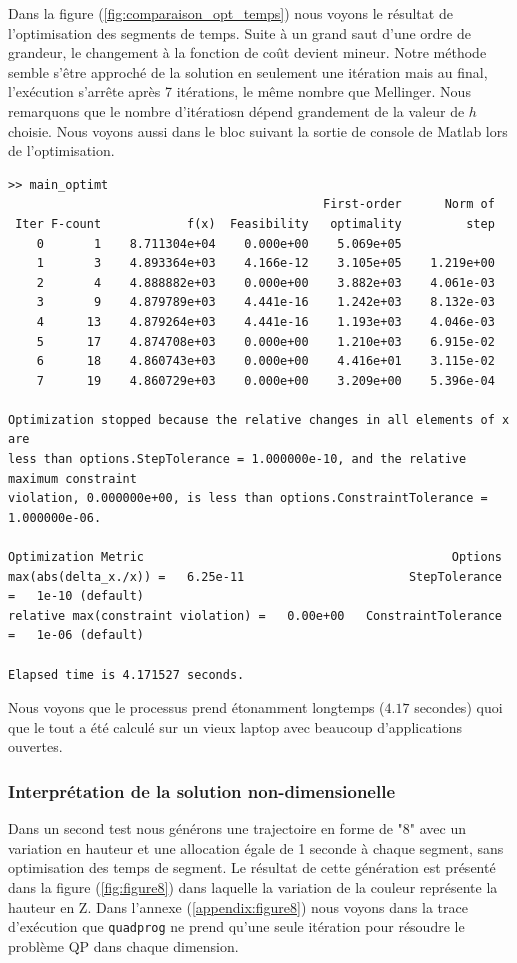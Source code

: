 Dans la figure (\ref{fig:comparaison_opt_temps}) nous voyons le résultat de l'optimisation des segments de temps. Suite à un grand saut d'une ordre de grandeur, le changement à la fonction de coût devient mineur. 
Notre méthode semble s'être approché de la solution en seulement une itération mais au final, l'exécution s'arrête après 7 itérations, le même nombre que Mellinger. Nous remarquons que le nombre d'itératiosn dépend grandement de la valeur de $h$ choisie. Nous voyons aussi dans le bloc suivant la sortie de console de Matlab lors de l'optimisation.

\begin{verbatim}
>> main_optimt
                                            First-order      Norm of
 Iter F-count            f(x)  Feasibility   optimality         step
    0       1    8.711304e+04    0.000e+00    5.069e+05
    1       3    4.893364e+03    4.166e-12    3.105e+05    1.219e+00
    2       4    4.888882e+03    0.000e+00    3.882e+03    4.061e-03
    3       9    4.879789e+03    4.441e-16    1.242e+03    8.132e-03
    4      13    4.879264e+03    4.441e-16    1.193e+03    4.046e-03
    5      17    4.874708e+03    0.000e+00    1.210e+03    6.915e-02
    6      18    4.860743e+03    0.000e+00    4.416e+01    3.115e-02
    7      19    4.860729e+03    0.000e+00    3.209e+00    5.396e-04

Optimization stopped because the relative changes in all elements of x are
less than options.StepTolerance = 1.000000e-10, and the relative maximum constraint
violation, 0.000000e+00, is less than options.ConstraintTolerance = 1.000000e-06.

Optimization Metric                                           Options
max(abs(delta_x./x)) =   6.25e-11                       StepTolerance =   1e-10 (default)
relative max(constraint violation) =   0.00e+00   ConstraintTolerance =   1e-06 (default)

Elapsed time is 4.171527 seconds.
\end{verbatim}

Nous voyons que le processus prend étonamment longtemps ($4.17$ secondes) quoi que le tout a été calculé sur un vieux laptop avec beaucoup d'applications ouvertes.

\subsubsection{Interprétation de la solution non-dimensionelle}

Dans un second test nous générons une trajectoire en forme de "8" avec un variation en hauteur et une allocation égale de 1 seconde à chaque segment, sans optimisation des temps de segment. Le résultat de cette génération est présenté dans la figure (\ref{fig:figure8}) dans laquelle la variation de la couleur représente la hauteur en Z. Dans l'annexe (\ref{appendix:figure8}) nous voyons dans la trace d'exécution que \texttt{quadprog} ne prend qu'une seule itération pour résoudre le problème QP dans chaque dimension. 

